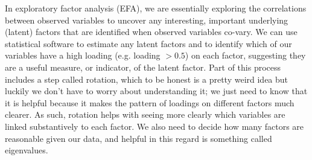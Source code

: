 In exploratory factor analysis (EFA), we are essentially exploring the correlations between observed variables to uncover any interesting, important underlying (latent) factors that are identified when observed variables co-vary. We can use statistical software to estimate any latent factors and to identify which of our variables have a high loading (e.g. loading $>0.5$) on each factor, suggesting they are a useful measure, or indicator, of the latent factor. Part of this process includes a step called rotation, which to be honest is a pretty weird idea but luckily we don’t have to worry about understanding it; we just need to know that it is helpful because it makes the pattern of loadings on different factors much clearer. As such, rotation helps with seeing more clearly which variables are linked substantively to each factor. We also need to decide how many factors are reasonable given our data, and helpful in this regard is something called eigenvalues. \begin{comment}We'll come back to this in a moment, after we have covered some of the main assumptions of EFA.


\SUBSECTION{Checking assumptions}

There are a couple of assumptions that need to be checked as part of the analysis. The first assumption is \keyterm{sphericity}, which essentially checks that the variables in your dataset are correlated with each other to the extent that they can potentially be summarised with a smaller set of factors. Bartlett’s test for sphericity checks whether the observed correlation matrix diverges significantly from a zero (or null) correlation matrix. So, if Bartlett’s test is significant ($p<.05$), this indicates that the observed correlation matrix is significantly divergent from the null, and is therefore suitable for EFA. 

The second assumption is \keyterm{sampling adequacy} and is checked using the Kaiser-Meyer-Olkin (KMO) Measure of Sampling Adequacy (MSA). The KMO index is a measure of the proportion of variance among observed variables that might be common variance. Using partial correlations, it checks for factors that load just two items. We seldom, if ever, want EFA producing a lot of factors loading just two items each. KMO is about sampling adequacy because partial correlations are typically seen with inadequate samples.  If the KMO index is high ($\approx$1), the EFA is efficient whereas if KMO is low ($\approx$0), the EFA is not relevant. KMO values smaller than 0.5 indicates that EFA is not suitable and a KMO value of 0.6 should be present before EFA is considered suitable. Values between 0.5 and 0.7 are considered adequate, values between 0.7 and 0.9 are good and values between 0.9 and 1.0 are excellent.
\end{comment}


